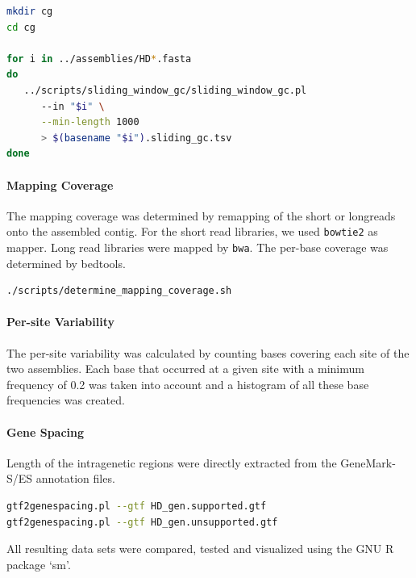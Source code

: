 \documentclass[12pt,a4paper]{scrartcl}
\begin{document}
\begin{lstlisting}[language=bash]
mkdir cg
cd cg

for i in ../assemblies/HD*.fasta
do
   ../scripts/sliding_window_gc/sliding_window_gc.pl
      --in "$i" \
      --min-length 1000
      > $(basename "$i").sliding_gc.tsv
done
\end{lstlisting}

\paragraph{Mapping Coverage}
The mapping coverage was determined by remapping of the short or
longreads onto the assembled contig. For the short read libraries, we
used \texttt{bowtie2} as mapper. Long read libraries were mapped by
\texttt{bwa}. The per-base coverage was determined by bedtools.

\begin{lstlisting}[language=bash]
./scripts/determine_mapping_coverage.sh
\end{lstlisting}

\paragraph{Per-site Variability}

The per-site variability was calculated by counting bases covering each
site of the two assemblies. Each base that occurred at a given site with
a minimum frequency of \num{0.2} was taken into account and a histogram of
all these base frequencies was created.

\paragraph{Gene Spacing}

Length of the intragenetic regions were directly extracted from the
GeneMark-S/ES annotation files.

\begin{lstlisting}[language=bash]
gtf2genespacing.pl --gtf HD_gen.supported.gtf 
gtf2genespacing.pl --gtf HD_gen.unsupported.gtf
\end{lstlisting}

All resulting data sets were compared, tested and visualized using the
GNU R package `sm'.

\printbibliography
\end{document}
